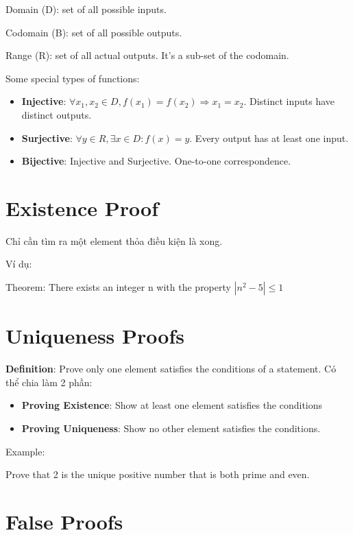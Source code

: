 Domain (D): set of all possible inputs.

Codomain (B): set of all possible outputs.

Range (R): set of all actual outputs. It's a sub-set of the codomain.

Some special types of functions:

\begin{itemize}
  \item \textbf{Injective}: $\forall x_{1}, x_{2}\in D, f(x_{1})=f(x_{2}) \Rightarrow x_{1}=x_{2}$. Distinct inputs have distinct outputs.
  \item \textbf{Surjective}: $\forall y \in R, \exists x \in D : f(x)=y$. Every output has at least one input.
  \item \textbf{Bijective}: Injective and Surjective. One-to-one correspondence.
\end{itemize}

\section{Existence Proof}

Chỉ cần tìm ra một element thỏa điều kiện là xong.

Ví dụ:

Theorem: There exists an integer n with the property $|n^{2}-5| \leq 1$

\section{Uniqueness Proofs}

\textbf{Definition}: Prove only one element satisfies the conditions of a statement. Có thể chia làm 2 phần:

\begin{itemize}
  \item \textbf{Proving Existence}: Show at least one element satisfies the conditions
  \item \textbf{Proving Uniqueness}: Show no other element satisfies the conditions.
\end{itemize}

Example:

Prove that 2 is the unique positive number that is both prime and even.

\section{False Proofs}

